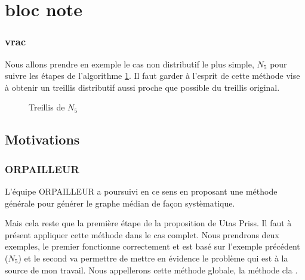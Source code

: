 \part{bloc note}

\section{vrac}

Nous allons prendre en exemple le cas non distributif le plus simple, $N_5$ pour suivre les étapes de l'algorithme \ref{treillis_n5}. Il faut garder à l'esprit de cette méthode vise à obtenir un treillis distributif aussi proche que possible du treillis original.

\begin{figure}[H]
	\begin{center}
	\end{center}
	\caption{Treillis de $N_5$}
	\label{treillis_n5}
\end{figure}

\chapter{Motivations}

\section{ORPAILLEUR}

L'équipe ORPAILLEUR a poursuivi en ce sens \cite{cla2018} en proposant une méthode générale pour générer le graphe médian de façon systèmatique. 

\bigbreak

 Mais cela reste que la première étape de la proposition de Utas Priss. Il faut à présent appliquer cette méthode dans le cas complet. Nous prendrons deux exemples, le premier fonctionne correctement et est basé sur l'exemple précédent ($N_5$) et le second va permettre de mettre en évidence le problème qui est à la source de mon travail. Nous appellerons cette méthode globale, la \guillemotleft{} méthode cla \guillemotright{}.

